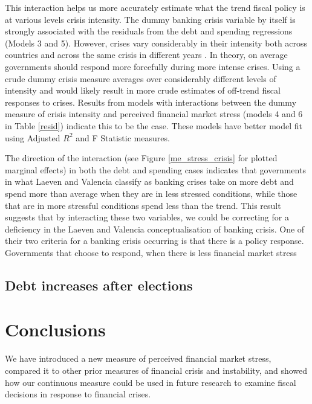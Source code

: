 \documentclass[]{article}
\begin{document}
This interaction helps us more accurately estimate what the trend fiscal policy is at various levels crisis intensity. The dummy banking crisis variable by itself is strongly associated with the residuals from the debt and spending regressions (Models 3 and 5). However, crises vary considerably in their intensity both across countries and across the same crisis in different years \cite{gandrudHallEPFMS}. In theory, on average governments should respond more forcefully during more intense crises. Using a crude dummy crisis measure averages over considerably different levels of intensity and would likely result in more crude estimates of off-trend fiscal responses to crises. Results from models with interactions between the dummy measure of crisis intensity and perceived financial market stress (models 4 and 6 in Table \ref{resid}) indicate this to be the case. These models have better model fit using Adjusted $R^{2}$ and F Statistic measures.

The direction of the interaction (see Figure \ref{me_stress_crisis} for plotted marginal effects) in both the debt and spending cases indicates that governments in what Laeven and Valencia classify as banking crises take on more debt and spend more than average when they are in less stressed conditions, while those that are in more stressful conditions spend less than the trend. This result suggests that by interacting these two variables, we could be correcting for a deficiency in the Laeven and Valencia conceptualisation of banking crisis. One of their two criteria for a banking crisis occurring is that there is a policy response. Governments that choose to respond, when there is less financial market stress


\subsection{Debt increases after elections}



\section{Conclusions}\label{conclusions}

We have introduced a new measure of perceived financial market stress, compared it to other prior measures of financial crisis and instability, and showed how our continuous measure could be used in future research to examine fiscal decisions in response to financial crises.
\end{document}
